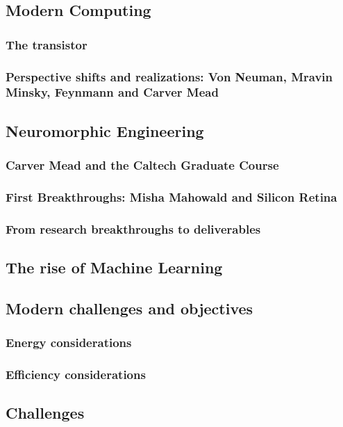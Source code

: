 \subsection{Modern Computing}
\subsubsection{The transistor}
\subsubsection{Perspective shifts and realizations: Von Neuman, Mravin Minsky, Feynmann and Carver Mead}

\subsection{Neuromorphic Engineering}
\subsubsection{Carver Mead and the Caltech Graduate Course}
\subsubsection{First Breakthroughs: Misha Mahowald and Silicon Retina}
\subsubsection{From research breakthroughs to deliverables}

\subsection{The rise of Machine Learning}

\subsection{Modern challenges and objectives}
\subsubsection{Energy considerations}
\subsubsection{Efficiency considerations}
\subsection{Challenges}





